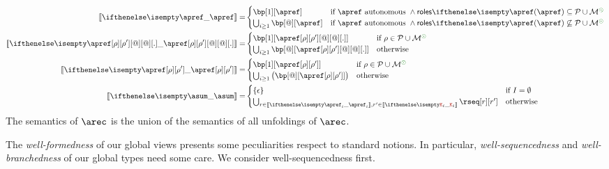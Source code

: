 \begin{align*}
  \ksem{\apref} =
  &
    \begin{cases}
      \bp[1][\apref]
      & \text{if $\apref$ autonomous } \land \roles{\apref} \subseteq \participants \cup \multiroles^\unknownop
      \\
      \bigcup_{i \geq 1}\bp[@][\apref]
      & \text{if $\apref$ autonomous } \land \roles{\apref} \not\subseteq \participants \cup \multiroles^\unknownop
    \end{cases}
  \\
  \ksem{\apref[\arole][\arole'][@][@][.]} =
  &
    \begin{cases}
      \bp[1][{\apref[\arole][\arole'][@][@][.]}]
      & \text{if } \arole \in \participants \cup \multiroles^\unknownop
      \\
      \bigcup_{i \geq 1}\bp[@][{\apref[\arole][\arole'][@][@][.]}]
      & \text{otherwise}
    \end{cases}
  \\
  \ksem{\apref[\arole][\arole']} =
  &
    \begin{cases}
      \bp[1][{\apref[\arole][\arole']}]
      & \text{if } \arole \in \participants \cup \multiroles^\unknownop
      \\
      \bigcup_{i \geq 1}\big(\bp[@][{\apref[\arole][\arole']}]\big)
      & \text{otherwise}
    \end{cases}
  \\
  \ksem \asum =
  &
    \begin{cases}
      \{ \emptypom \} & \text{if } I = \emptyset
      \\
      \bigcup_{\apom \in \ksem{\apref_i},\apom' \in \ksem{\aK_i}} \rseq[\apom][\apom']
      & \text{otherwise}
    \end{cases}
\end{align*}
The semantics of $\arec$ is the union of the semantics of all
unfoldings of $\arec$.

\hsl


The \emph{well-formedness} of our global views presents some
peculiarities respect to standard notions.
%
In particular, \emph{well-sequencedness} and \emph{well-branchedness}
of our global types need some care.
%
We consider well-sequencedness first.

